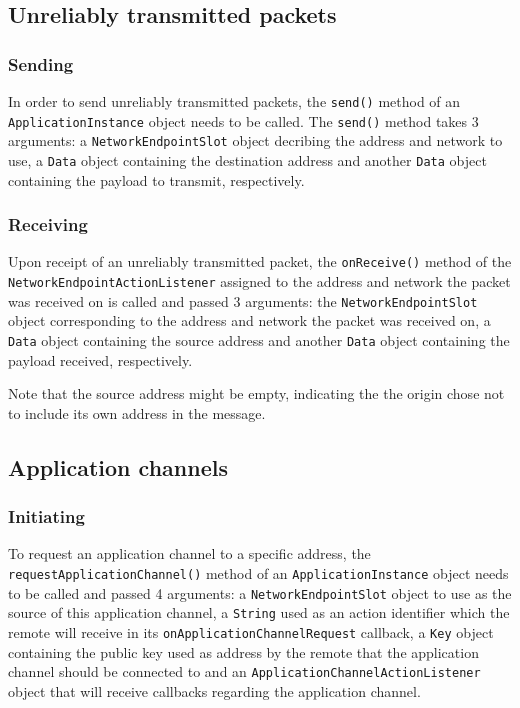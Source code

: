 \documentclass[a4paper,twoside,twocolumn,DIV=12,BCOR=1cm]{scrartcl}
\newcommand{\code}[1]{\texttt{#1}}
\begin{document}
\subsection*{Unreliably transmitted packets}
\subsubsection*{Sending}
In order to send unreliably transmitted packets, the \code{send()} method of an
\code{ApplicationInstance} object needs to be called.
The \code{send()} method takes 3 arguments: a \code{NetworkEndpointSlot} object
decribing the address and network to use, a \code{Data} object containing the
destination address and another \code{Data} object containing the payload to
transmit, respectively.

\subsubsection*{Receiving}
Upon receipt of an unreliably transmitted packet, the \code{onReceive()} method
of the \code{NetworkEndpointActionListener} assigned to the address and network
the packet was received on is called and passed 3 arguments:
the \code{NetworkEndpointSlot} object corresponding to the address and network
the packet was received on, a \code{Data} object containing the source address
and another \code{Data} object containing the payload received, respectively.

Note that the source address might be empty, indicating the the origin chose not
to include its own address in the message.

\subsection*{Application channels}
\subsubsection*{Initiating}
To request an application channel to a specific address, the
\code{requestApplicationChannel()} method of an \code{ApplicationInstance}
object needs to be called and passed 4 arguments: a \code{NetworkEndpointSlot}
object to use as the source of this application channel, a \code{String} used as
an action identifier which the remote will receive in its
\code{onApplicationChannelRequest} callback, a \code{Key} object containing the
public key used as address by the remote that the application channel should be
connected to and an \code{ApplicationChannelActionListener} object that will
receive callbacks regarding the application channel.
\end{document}
